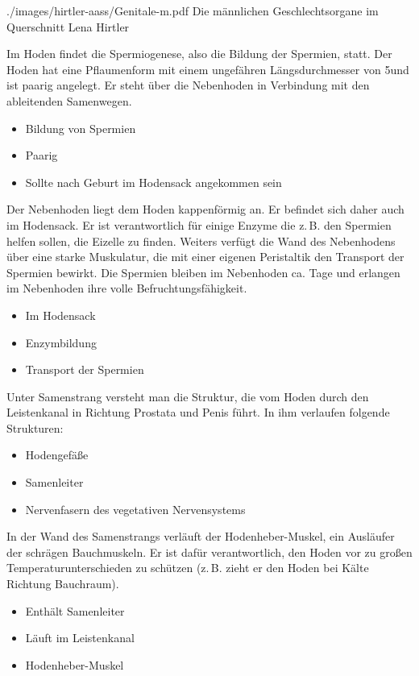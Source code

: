 {}
{}
{}
{./images/hirtler-aass/Genitale-m.pdf}
{Die männlichen Geschlechtsorgane im
Querschnitt}
{Lena Hirtler}


{%
Im Hoden findet die Spermiogenese, also die Bildung der
Spermien, statt. Der Hoden hat eine Pflaumenform mit einem
ungefähren Längsdurchmesser von 5\CM* und ist paarig 
angelegt. Er steht über die Nebenhoden in Verbindung mit den
ableitenden Samenwegen.

}
{
\begin{itemize}
  \item Bildung von Spermien
  \item Paarig
  \item Sollte nach Geburt im Hodensack angekommen sein
\end{itemize}
}
{}{}{}


{%
Der Nebenhoden liegt dem Hoden kappenförmig an. Er befindet
sich daher auch im Hodensack. Er ist verantwortlich für
einige Enzyme die z.\,B. den Spermien helfen sollen, die
Eizelle zu finden. Weiters verfügt die Wand des Nebenhodens
über eine starke Muskulatur, die mit einer eigenen
Peristaltik den Transport der Spermien bewirkt. Die Spermien
bleiben im Nebenhoden ca.  Tage und erlangen
im Nebenhoden ihre volle Befruchtungsfähigkeit.
}{
\begin{itemize}
  \item Im Hodensack
  \item Enzymbildung
  \item Transport der Spermien
\end{itemize}

}{}{}{}


{
Unter Samenstrang versteht man die Struktur, die vom Hoden durch den
Leistenkanal in Richtung Prostata und Penis führt.
In ihm verlaufen folgende Strukturen:
\begin{itemize}
  \item Hodengefäße
  \item Samenleiter
  \item Nervenfasern des vegetativen Nervensystems
\end{itemize}

In der Wand des Samenstrangs verläuft der Hodenheber-Muskel,
ein Ausläufer der schrägen Bauchmuskeln. Er ist dafür
verantwortlich, den Hoden vor zu großen
Temperaturunterschieden zu schützen (z.\,B. zieht er den
Hoden bei Kälte Richtung Bauchraum).
}
{
\begin{itemize}
  \item Enthält Samenleiter
  \item Läuft im Leistenkanal
  \item Hodenheber-Muskel
\end{itemize}
}{}{}{}


